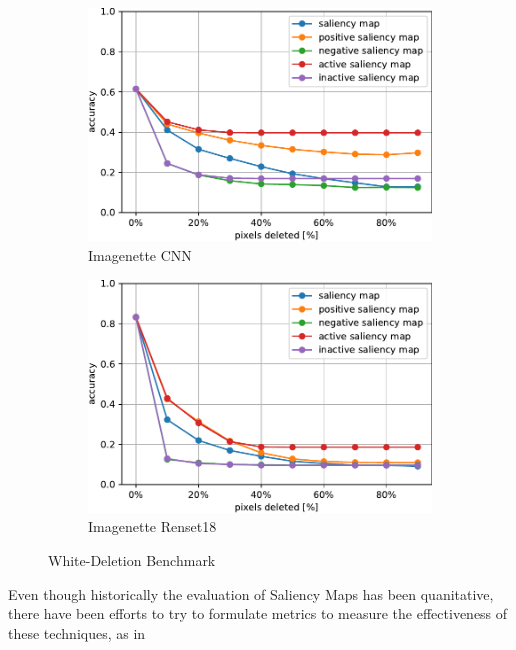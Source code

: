 \documentclass[preprint,12pt]{elsarticle}
\begin{document}
\begin{figure}
\begin{subfigure}{0.49\textwidth}
        \includegraphics[width=\linewidth]{../visualizations/benchmarks/white_deletion/imagenette_cnn.pdf}
        \caption{Imagenette CNN}
    \end{subfigure}
    \hfill
    \begin{subfigure}{0.49\textwidth}
        \centering
        \includegraphics[width=\linewidth]{../visualizations/benchmarks/white_deletion/imagenette_resnet18.pdf}
        \caption{Imagenette Renset18}
    \end{subfigure}
    \caption{White-Deletion Benchmark}
    \label{fig: white-deletion benchmark}
\end{figure}

Even though historically the evaluation of Saliency Maps has been quanitative, there have been efforts to try to formulate metrics to measure the effectiveness of these techniques, as in 
\end{document}
